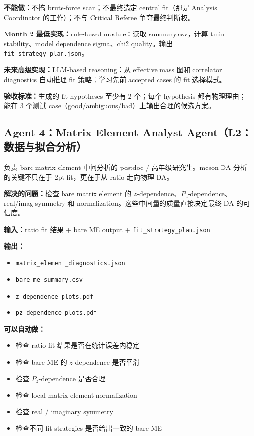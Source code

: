 \documentclass[11pt,a4paper,fontset=fandol]{ctexart}
\begin{document}
\textbf{不能做：}不搞 brute-force scan；不最终选定 central fit（那是 Analysis Coordinator 的工作）；不与 Critical Referee 争夺最终判断权。

\textbf{Month 2 最低实现：}rule-based module：读取 summary.csv，计算 tmin stability、model dependence sigma、chi2 quality。输出 \texttt{fit\_strategy\_plan.json}。

\textbf{未来高级实现：}LLM-based reasoning：从 effective mass 图和 correlator diagnostics 自动推理 fit 策略；学习先前 accepted cases 的 fit 选择模式。

\textbf{验收标准：}生成的 fit hypotheses 至少有 2 个；每个 hypothesis 都有物理理由；能在 3 个测试 case（good/ambiguous/bad）上输出合理的候选方案。

\subsection{Agent 4：Matrix Element Analyst Agent（L2：数据与拟合分析）}

\begin{tcolorbox}[colback=gray!5,colframe=gray!50,title=真实科研组类比]
负责 bare matrix element 中间分析的 postdoc / 高年级研究生。meson DA 分析的关键不只在于 2pt fit，更在于从 ratio 走向物理 DA。
\end{tcolorbox}

\textbf{解决的问题：}检查 bare matrix element 的 $z$-dependence、$P_z$-dependence、real/imag symmetry 和 normalization。这些中间量的质量直接决定最终 DA 的可信度。

\textbf{输入：}ratio fit 结果 + bare ME output + \texttt{fit\_strategy\_plan.json}

\textbf{输出：}
\begin{itemize}
  \item \texttt{matrix\_element\_diagnostics.json}
  \item \texttt{bare\_me\_summary.csv}
  \item \texttt{z\_dependence\_plots.pdf}
  \item \texttt{pz\_dependence\_plots.pdf}
\end{itemize}

\textbf{可以自动做：}
\begin{itemize}
  \item 检查 ratio fit 结果是否在统计误差内稳定
  \item 检查 bare ME 的 $z$-dependence 是否平滑
  \item 检查 $P_z$-dependence 是否合理
  \item 检查 local matrix element normalization
  \item 检查 real / imaginary symmetry
  \item 检查不同 fit strategies 是否给出一致的 bare ME
\end{itemize}
\end{document}
